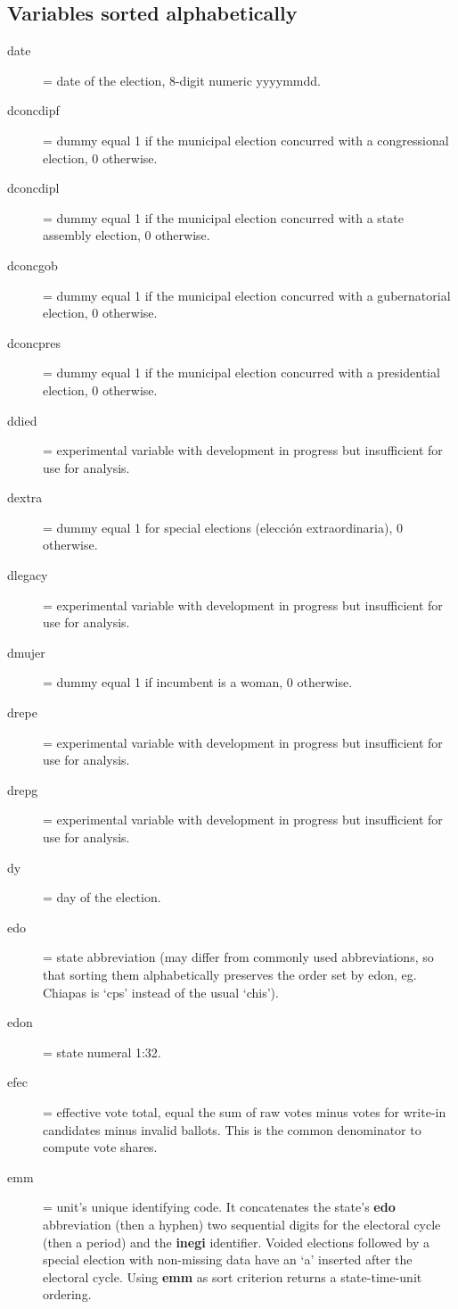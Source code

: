 \documentclass[letter,12pt]{article}
\begin{document}
\begin{singlespace}
\subsection{Variables sorted alphabetically}
\begin{description}
\item[date] = date of the election, 8-digit numeric yyyymmdd. 
\item[dconcdipf] = dummy equal 1 if the municipal election concurred with a congressional election, 0 otherwise. 
\item[dconcdipl] = dummy equal 1 if the municipal election concurred with a state assembly election, 0 otherwise. 
\item[dconcgob]  = dummy equal 1 if the municipal election concurred with a gubernatorial election, 0 otherwise. 
\item[dconcpres] = dummy equal 1 if the municipal election concurred with a presidential election, 0 otherwise. 
\item[ddied] = experimental variable with development in progress but insufficient for use for analysis.
\item[dextra] = dummy equal 1 for special elections (elección extraordinaria), 0 otherwise.
\item[dlegacy] = experimental variable with development in progress but insufficient for use for analysis.
\item[dmujer] = dummy equal 1 if incumbent is a woman, 0 otherwise. 
\item[drepe] = experimental variable with development in progress but insufficient for use for analysis.
\item[drepg] = experimental variable with development in progress but insufficient for use for analysis.
\item[dy] = day of the election.
\item[edo] = state abbreviation (may differ from commonly used abbreviations, so that sorting them alphabetically preserves the order set by edon, eg. Chiapas is `cps' instead of the usual `chis').
\item[edon] = state numeral 1:32.
\item[efec] = effective vote total, equal the sum of raw votes minus votes for write-in candidates minus invalid ballots. This is the common denominator to compute vote shares.
\item[emm] = unit's unique identifying code. It concatenates the state's \textbf{edo} abbreviation (then a hyphen) two sequential digits for the electoral cycle (then a period) and the \textbf{inegi} identifier. Voided elections followed by a special election with non-missing data have an `a' inserted after the electoral cycle. Using \textbf{emm} as sort criterion returns a state-time-unit ordering. 

\end{description}
\end{singlespace}
\end{document}
